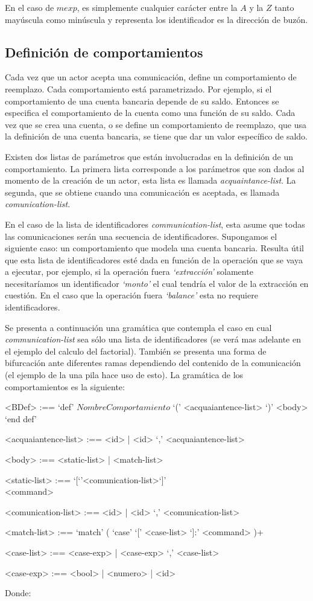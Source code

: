 En el caso de $mexp$, es simplemente cualquier carácter entre la $A$ y la $Z$ tanto mayúscula como minúscula y representa los identificador es la dirección de buzón.

\subsection{Definición de comportamientos}\label{actores:beha}
Cada vez que un actor acepta una comunicación, define un comportamiento de reemplazo. Cada comportamiento está parametrizado. Por ejemplo, si el comportamiento de una cuenta bancaria depende de su saldo. Entonces se especifica el comportamiento de la cuenta como una función de su saldo. Cada vez que se crea una cuenta, o se define un comportamiento de reemplazo, que usa la definición de una cuenta bancaria, se tiene que dar un valor específico de saldo.

Existen dos listas de parámetros que están involucradas en la definición de un comportamiento. La primera lista corresponde a los parámetros que son dados al momento de la creación de un actor, esta lista es llamada \textit{acquaintance-list}. La segunda, que se obtiene cuando una comunicación es aceptada, es llamada \textit{comunication-list}.

En el caso de la lista de identificadores \textit{communication-list}, esta asume que todas las comunicaciones serán una secuencia de identificadores. Supongamos el siguiente caso: un comportamiento que modela una cuenta bancaria. Resulta útil que esta lista de identificadores esté dada en función de la operación que se vaya a ejecutar, por ejemplo, si la operación fuera \textit{`extracción'} solamente necesitaríamos un identificador \textit{`monto'} el cual tendría el valor de la extracción en cuestión. En el caso que la operación fuera \textit{`balance'} esta no requiere identificadores. 

Se presenta a continuación una gramática que contempla el caso en cual \textit{communication-list} sea sólo una lista de identificadores (se verá mas adelante en el ejemplo del calculo del factorial). También se presenta una forma de bifurcación ante diferentes ramas dependiendo del contenido de la comunicación (el ejemplo de la una pila hace uso de esto). La gramática de los comportamientos es la siguiente:

\begin{grammar}
<BDef> :== `def' $NombreComportamiento$ `(' <acquaiantence-list> `)' <body> `end def'

<acquaiantence-list> :== <id> | <id> `,' <acquaiantence-list> 

<body> :== <static-list> | <match-list>

<static-list> :== `[`'<comunication-list>`]' \\ <command>

<comunication-list> :== <id> | <id> `,' <comunication-list>

<match-list> :==  `match' ( `case' `[' <case-list> `]:' <command> )+  

<case-list> :== <case-exp> | <case-exp> `,' <case-list> 

<case-exp> :== <bool> | <numero> | <id>  
\end{grammar}
Donde: 

